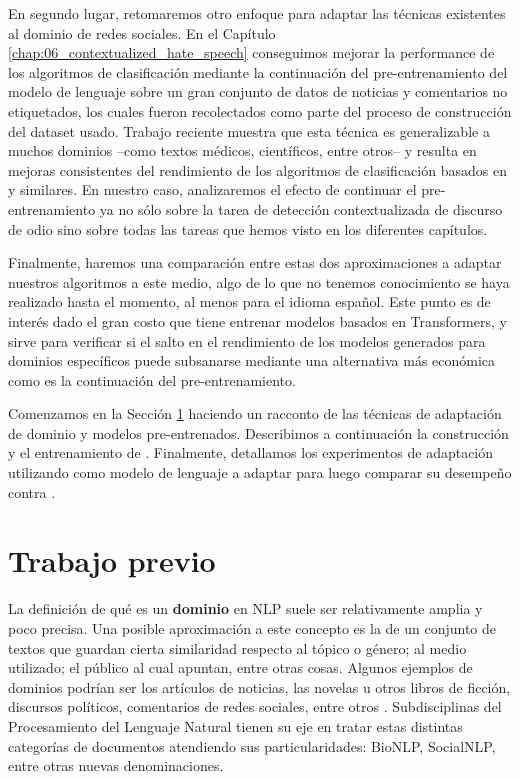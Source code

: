En segundo lugar, retomaremos otro enfoque para adaptar las técnicas existentes al dominio de redes sociales. En el Capítulo \ref{chap:06_contextualized_hate_speech} conseguimos mejorar la performance de los algoritmos de clasificación mediante la continuación del pre-entrenamiento del modelo de lenguaje sobre un gran conjunto de datos de noticias y comentarios no etiquetados, los cuales fueron recolectados como parte del proceso de construcción del dataset usado. Trabajo reciente muestra que esta técnica es generalizable a muchos dominios --como textos médicos, científicos, entre otros-- y resulta en mejoras consistentes del rendimiento de los algoritmos de clasificación basados en \bert{} y similares. En nuestro caso, analizaremos el efecto de continuar el pre-entrenamiento ya no sólo sobre la tarea de detección contextualizada de discurso de odio sino sobre todas las tareas que hemos visto en los diferentes capítulos.

Finalmente, haremos una comparación entre estas dos aproximaciones a adaptar nuestros algoritmos a este medio, algo de lo que no tenemos conocimiento se haya realizado hasta el momento, al menos para el idioma español. Este punto es de interés dado el gran costo que tiene entrenar modelos basados en Transformers, y sirve para verificar si el salto en el rendimiento de los modelos generados para dominios específicos puede subsanarse mediante una alternativa más económica como es la continuación del pre-entrenamiento.

Comenzamos en la Sección \ref{sec:domain_adaptation_previous_work} haciendo un racconto de las técnicas de adaptación de dominio y modelos pre-entrenados. Describimos a continuación la  construcción y el entrenamiento de \robertuito{} \cite{perez2021robertuito}. Finalmente, detallamos los experimentos de adaptación utilizando \beto{} como modelo de lenguaje a adaptar para luego comparar su desempeño contra \robertuito{}.

\section{Trabajo previo}
\label{sec:domain_adaptation_previous_work}

La definición de qué es un \textbf{dominio} en NLP suele ser relativamente amplia y poco precisa. Una posible aproximación a este concepto es la de un conjunto de textos que guardan cierta similaridad respecto al tópico o género; al medio utilizado; el público al cual apuntan, entre otras cosas. Algunos ejemplos de dominios podrían ser los artículos de noticias, las novelas u otros libros de ficción, discursos políticos, comentarios de redes sociales, entre otros \cite{gururangan-etal-2020-dont}. Subdisciplinas del Procesamiento del Lenguaje Natural tienen su eje en tratar estas distintas categorías de documentos atendiendo sus particularidades: BioNLP, SocialNLP, entre otras nuevas denominaciones.

